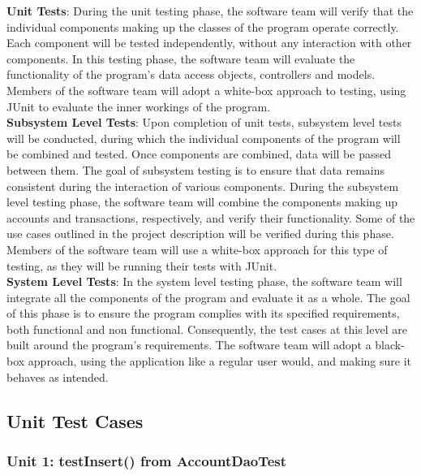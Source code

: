\documentclass[12pt]{article}
\begin{document}
{

\textbf{Unit Tests}: During the unit testing phase, the software team will verify that the individual components making up the classes of the program operate correctly. Each component will be tested independently, without any interaction with other components. In this testing phase, the software team will evaluate the functionality of the program's data access objects, controllers and models. Members of the software team will adopt a white-box approach to testing, using JUnit to evaluate the inner workings of the program.\\


\textbf{Subsystem Level Tests}: Upon completion of unit tests, subsystem level tests will be conducted, during which the individual components of the program will be combined and tested. Once components are combined, data will be passed between them. The goal of subsystem testing is to ensure that data remains consistent during the interaction of various components. During the subsystem level testing phase, the software team will combine the components making up accounts and transactions, respectively, and verify their functionality. Some of the use cases outlined in the project description will be verified during this phase. Members of the software team will use a white-box approach for this type of testing, as they will be running their tests with JUnit.\\


\textbf{System Level Tests}: In the system level testing phase, the software team will integrate all the components of the program and evaluate it as a whole. The goal of this phase is to ensure the program complies with its specified requirements, both functional and non functional. Consequently, the test cases at this level are built around the program's requirements. The software team will adopt a black-box approach, using the application like a regular user would, and making sure it behaves as intended. 

}

\subsection{Unit Test Cases}

\subsubsection{Unit 1: testInsert() from AccountDaoTest}
\end{document}
